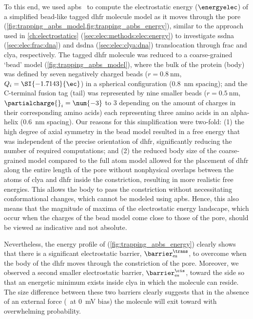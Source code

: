 To this end, we used \gls{apbs}~\cite{Baker-2001,Dolinsky-2004,Dolinsky-2007,Li-2005} to compute the
electrostatic energy ($\energyelec$) of a simplified bead-like tagged \gls{dhfr} molecule model as it moves
through the pore (\cref{fig:trapping_apbs_model,fig:trapping_apbs_energy}), similar to the approach used in
\cref{ch:electrostatics} (\cref{sec:elec:methods:elec:energy}) to investigate \gls{ssdna}
(\cref{sec:elec:frac:dna}) and \gls{dsdna} (\cref{sec:elec:clya:dna}) translocation through \gls{frac} and
\gls{clya}, respectively. The tagged \gls{dhfr} molecule was reduced to a coarse-grained `bead' model
(\cref{fig:trapping_apbs_model}), where the bulk of the protein (body) was defined by seven negatively charged
beads ($r = \SI{0.8}{\nm}$, $Q_i = \SI{-1.7143}{\ec}$) in a spherical configuration (\SI{0.8}{\nm} spacing);
and the C-terminal fusion tag (tail) was represented by nine smaller beads ($r = \SI{0.5}{\nm}$,
$\partialcharge{}_i = \num{-3}$ to \SI{+3}{\ec} depending on the amount of charges in their corresponding
amino acids) each representing three amino acids in an alpha-helix (\SI{0.6}{\nm}   spacing). Our reasons for
this simplification were two-fold: (1) the high degree of axial symmetry in the bead model resulted in a free
energy that was independent of the precise orientation of \gls{dhfr}, significantly reducing the number of
required computations; and (2) the reduced body size of the coarse-grained model compared to the full atom
model allowed for the placement of \gls{dhfr} along the entire length of the pore without nonphysical overlaps
between the atoms of \gls{clya} and \gls{dhfr} inside the \transi{} constriction, resulting in more realistic
free energies. This allows the body to pass the constriction without necessitating conformational changes,
which cannot be modeled using \gls{apbs}. Hence, this also means that the magnitude of maxima of the
electrostatic energy landscape, which occur when the charges of the bead model come close to those of the
pore, should be viewed as indicative and not absolute.

Nevertheless, the energy profile of \DHFRt{} (\cref{fig:trapping_apbs_energy}) clearly shows that there is a
significant electrostatic barrier, $\barrier^{\trans}_{\rm{es}}$, to overcome when the body of the \gls{dhfr}
moves through the constriction of the pore. Moreover, we observed a second smaller electrostatic barrier,
$\barrier^{\cis}_{\rm{es}}$, toward the \cisi{} side so that an energetic minimum exists inside \gls{clya} in
which the molecule can reside. The size difference between these two barriers clearly suggests that in the
absence of an external force (\ie~at \SI{0}{\mV} bias) the molecule will exit toward \cisi{} with overwhelming
probability.

